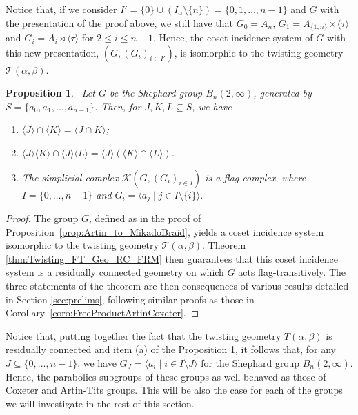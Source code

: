 \documentclass[11pt,letterpaper]{amsart}
\newtheorem{prop}{Proposition}[section]
\newcommand{\TT}{\mathcal{T}}
\begin{document}
Notice that, if we consider $I'= \{0\}\cup (I_\alpha\setminus\{n\}) = \{0,1,\ldots,n-1\}$ and $G$ with the presentation of the proof above, we still have that $G_0 = A_n$, $G_1 = A_{\{1,n\}}\rtimes\langle \tau\rangle$ and $G_i=A_i\rtimes\langle \tau\rangle$ for $2\leq i\leq n-1$. Hence, the coset incidence system of $G$ with this new presentation, $(G,(G_i)_{i\in I'})$, is isomorphic to the twisting geometry $\TT(\alpha,\beta)$.
\begin{prop}~\label{prop:Mikado_intersect_flagchmabercomplex}
    Let $G$ be the Shephard group $B_n(2,\infty)$, generated by $S=\{a_0,a_1,\ldots,a_{n-1}\}$. Then, for $J,K,L\subseteq S$, we have
    \begin{enumerate}
        \item $\langle J\rangle\cap \langle K\rangle = \langle J\cap K\rangle$;
        \item $\langle J\rangle\langle K\rangle\cap \langle J\rangle\langle L\rangle = \langle J\rangle(\langle K\rangle\cap \langle L\rangle)$.
        \item The simplicial complex $\mathcal{K}(G,(G_i)_{i\in I})$ is a flag-complex, where $I=\{0,\ldots,n-1\}$ and $G_i=\langle a_j\mid j\in I\setminus\{i\}\rangle$.
    \end{enumerate}
\end{prop}
\begin{proof}
    The group $G$, defined as in the proof of Proposition~\ref{prop:Artin_to_MikadoBraid}, yields a coset incidence system isomorphic to the twisting geometry $\TT(\alpha,\beta)$. Theorem \ref{thm:Twisting_FT_Geo_RC_FRM} then guarantees that this coset incidence system is a residually connected geometry on which $G$ acts flag-transitively. The three statements of the theorem are then consequences of various results detailed in Section \ref{sec:prelims}, following similar proofs as those in Corollary~\ref{coro:FreeProductArtinCoxeter}.
\end{proof}

Notice that, putting together the fact that the twisting geometry $T(\alpha,\beta)$ is residually connected and item (a) of the Proposition \ref{prop:Mikado_intersect_flagchmabercomplex}, it follows that, for any $J\subseteq \{0,\ldots,n-1\}$, we have $G_J=\langle a_i\mid i\in I\setminus J\rangle$ for the Shephard group $B_n(2,\infty)$. Hence, the parabolics subgroups of these groups as well behaved as those of Coxeter and Artin-Tits groups. This will be also the case for each of the groups we will investigate in the rest of this section.
\end{document}
